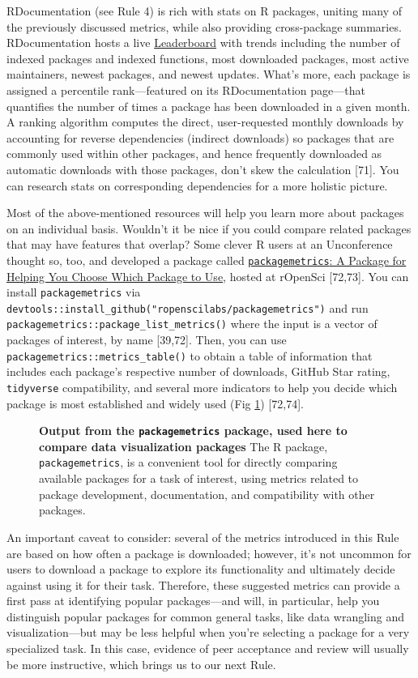 \documentclass[10pt,letterpaper]{article}
\begin{document}
RDocumentation (see Rule 4) is rich with stats on R packages, uniting
many of the previously discussed metrics, while also providing
cross-package summaries. RDocumentation hosts a live
\href{https://www.rdocumentation.org/trends}{Leaderboard} with trends
including the number of indexed packages and indexed functions, most
downloaded packages, most active maintainers, newest packages, and
newest updates. What's more, each package is assigned a percentile
rank---featured on its RDocumentation page---that quantifies the number
of times a package has been downloaded in a given month. A ranking
algorithm computes the direct, user-requested monthly downloads by
accounting for reverse dependencies (indirect downloads) so packages
that are commonly used within other packages, and hence frequently
downloaded as automatic downloads with those packages, don't skew the
calculation {[}71{]}. You can research stats on corresponding
dependencies for a more holistic picture.

Most of the above-mentioned resources will help you learn more about
packages on an individual basis. Wouldn't it be nice if you could
compare related packages that may have features that overlap? Some
clever R users at an Unconference thought so, too, and developed a
package called
\href{https://docs.ropensci.org/packagemetrics/}{\texttt{packagemetrics}:
A Package for Helping You Choose Which Package to Use}, hosted at
rOpenSci {[}72,73{]}. You can install \texttt{packagemetrics} via
\texttt{devtools::install\_github("ropenscilabs/packagemetrics")} and
run \texttt{packagemetrics::package\_list\_metrics()} where the input is
a vector of packages of interest, by name {[}39,72{]}. Then, you can use
\texttt{packagemetrics::metrics\_table()} to obtain a table of
information that includes each package's respective number of downloads,
GitHub Star rating, \texttt{tidyverse} compatibility, and several more
indicators to help you decide which package is most established and
widely used (Fig \ref{fig7}) {[}72,74{]}.

\begin{figure}[!h]
\caption{{\bf Output from the \texttt{packagemetrics} package, used here to compare data visualization packages}
The R package, \texttt{packagemetrics}, is a convenient tool for directly comparing available packages for a task of interest, using metrics related to package development, documentation, and compatibility with other packages.}
\label{fig7}
\end{figure}

An important caveat to consider: several of the metrics introduced in
this Rule are based on how often a package is downloaded; however, it's
not uncommon for users to download a package to explore its
functionality and ultimately decide against using it for their task.
Therefore, these suggested metrics can provide a first pass at
identifying popular packages---and will, in particular, help you
distinguish popular packages for common general tasks, like data
wrangling and visualization---but may be less helpful when you're
selecting a package for a very specialized task. In this case, evidence
of peer acceptance and review will usually be more instructive, which
brings us to our next Rule.
\end{document}
